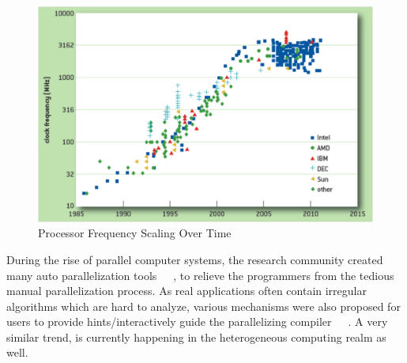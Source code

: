 \begin{figure}[htp]
\begin{center}
\includegraphics[width=0.6\linewidth]{chap1fig/cpuscaling.pdf}
\caption{Processor Frequency Scaling Over Time~\cite{Danowitz:2012:CDR:2133806.2133822}
\label{fig:cpuscaling}}
\end{center}
\end{figure}

During the rise of 
parallel computer systems, the research community created many auto parallelization tools~\cite{Wilson:1994:SCS:891422}~\cite{Blume94polaris:the}~\cite{oscar},
to relieve the programmers from the tedious manual parallelization process. As real applications
often contain irregular algorithms which are hard to analyze, various
mechanisms were also proposed for users to provide hints/interactively guide the parallelizing compiler~\cite{RiceUniversity:1993:HPF:174223.158909}~\cite{Liao:1999:SEI:329366.301108}~\cite{86108}.
% 
A very similar trend, is currently happening in the heterogeneous computing realm as well.



